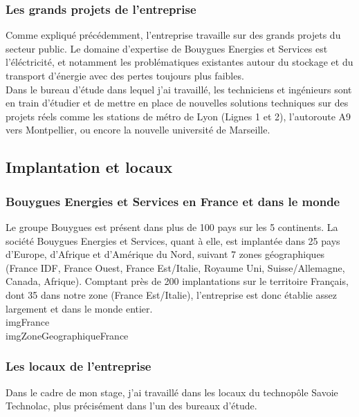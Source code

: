\documentclass[a4paper]{article}
\begin{document}
    \subsubsection{Les grands projets de l'entreprise}

    Comme expliqué précédemment, l'entreprise travaille sur des grands projets du secteur public. Le domaine d'expertise de Bouygues Energies et Services est l'éléctricité, et notamment les problématiques existantes autour du stockage et du transport d'énergie avec des pertes toujours plus faibles. \\

    Dans le bureau d'étude dans lequel j'ai travaillé, les techniciens et ingénieurs sont en train d'étudier et de mettre en place de nouvelles solutions techniques sur des projets réels comme les stations de métro de Lyon (Lignes 1 et 2), l’autoroute A9 vers Montpellier, ou encore la nouvelle université de Marseille. \\

    \subsection{Implantation et locaux}
    \subsubsection{Bouygues Energies et Services en France et dans le monde}

    Le groupe Bouygues est présent dans plus de 100 pays sur les 5 continents. La société Bouygues Energies et Services, quant à elle, est implantée dans 25 pays d’Europe, d’Afrique et d’Amérique du Nord, suivant 7 zones géographiques (France IDF, France Ouest, France Est/Italie, Royaume Uni, Suisse/Allemagne, Canada, Afrique). Comptant près de 200 implantations sur le territoire Français, dont 35 dans notre zone (France Est/Italie), l’entreprise est donc établie assez largement et dans le monde entier. \\

    imgFrance \\
    imgZoneGeographiqueFrance \\

    \subsubsection{Les locaux de l'entreprise}

    Dans le cadre de mon stage, j’ai travaillé dans les locaux du technopôle Savoie Technolac, plus précisément dans l'un des bureaux d’étude. \\
\end{document}
